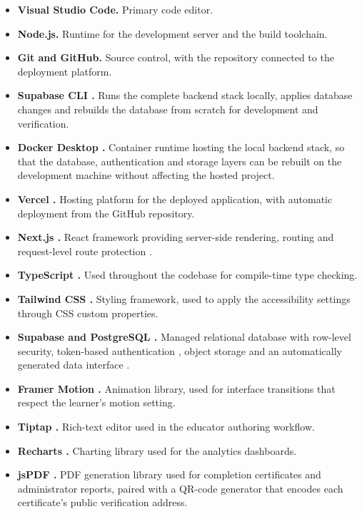 \documentclass[12pt, oneside]{article} %
\begin{document}
\begin{itemize}
    \item \textbf{Visual Studio Code.} Primary code editor.
    \item \textbf{Node.js.} Runtime for the development server and the build toolchain.
    \item \textbf{Git and GitHub.} Source control, with the repository connected to the deployment platform.
    \item \textbf{Supabase CLI \cite{supabase_cli}.} Runs the complete backend stack locally, applies database changes and rebuilds the database from scratch for development and verification.
    \item \textbf{Docker Desktop \cite{docker_docs}.} Container runtime hosting the local backend stack, so that the database, authentication and storage layers can be rebuilt on the development machine without affecting the hosted project.
    \item \textbf{Vercel \cite{vercel_docs}.} Hosting platform for the deployed application, with automatic deployment from the GitHub repository.
    \item \textbf{Next.js \cite{nextjs_ssr}.} React framework providing server-side rendering, routing and request-level route protection \cite{nextjs_middleware}.
    \item \textbf{TypeScript \cite{typescript_docs}.} Used throughout the codebase for compile-time type checking.
    \item \textbf{Tailwind CSS \cite{tailwind_docs}.} Styling framework, used to apply the accessibility settings through CSS custom properties.
    \item \textbf{Supabase and PostgreSQL \cite{supabase_docs,postgresql_docs}.} Managed relational database with row-level security, token-based authentication \cite{supabase_auth}, object storage and an automatically generated data interface \cite{postgrest_docs}.
    \item \textbf{Framer Motion \cite{framer_motion_docs}.} Animation library, used for interface transitions that respect the learner's motion setting.
    \item \textbf{Tiptap \cite{tiptap_docs}.} Rich-text editor used in the educator authoring workflow.
    \item \textbf{Recharts \cite{recharts_docs}.} Charting library used for the analytics dashboards.
    \item \textbf{jsPDF \cite{jspdf_docs}.} PDF generation library used for completion certificates and administrator reports, paired with a QR-code generator that encodes each certificate's public verification address.

\end{itemize}
\end{document}
